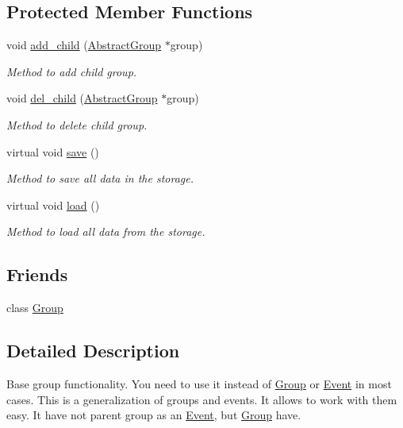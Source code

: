 \subsection*{Protected Member Functions}
\begin{DoxyCompactItemize}
\item 
void \hyperlink{classCore_1_1AbstractGroup_aef90e91087aa5fcf4a94f0f2677f8f56}{add\_\-child} (\hyperlink{classCore_1_1AbstractGroup}{AbstractGroup} $\ast$group)
\begin{DoxyCompactList}\small\item\em Method to add child group. \item\end{DoxyCompactList}\item 
void \hyperlink{classCore_1_1AbstractGroup_aa81866b9c414c24d25ca26311b4b4330}{del\_\-child} (\hyperlink{classCore_1_1AbstractGroup}{AbstractGroup} $\ast$group)
\begin{DoxyCompactList}\small\item\em Method to delete child group. \item\end{DoxyCompactList}\item 
virtual void \hyperlink{classCore_1_1AbstractGroup_ab8cc5ad1c04d67c24af785f9adb2d67c}{save} ()
\begin{DoxyCompactList}\small\item\em Method to save all data in the storage. \item\end{DoxyCompactList}\item 
virtual void \hyperlink{classCore_1_1AbstractGroup_ace41b51dd585a95b61990b69f078a283}{load} ()
\begin{DoxyCompactList}\small\item\em Method to load all data from the storage. \item\end{DoxyCompactList}\end{DoxyCompactItemize}
\subsection*{Friends}
\begin{DoxyCompactItemize}
\item 
class \hyperlink{classCore_1_1AbstractGroup_a2697825715974a353728f0d4d5658112}{Group}
\end{DoxyCompactItemize}


\subsection{Detailed Description}
Base group functionality. You need to use it instead of \hyperlink{classCore_1_1Group}{Group} or \hyperlink{classCore_1_1Event}{Event} in most cases. This is a generalization of groups and events. It allows to work with them easy. It have not parent group as an \hyperlink{classCore_1_1Event}{Event}, but \hyperlink{classCore_1_1Group}{Group} have. 

